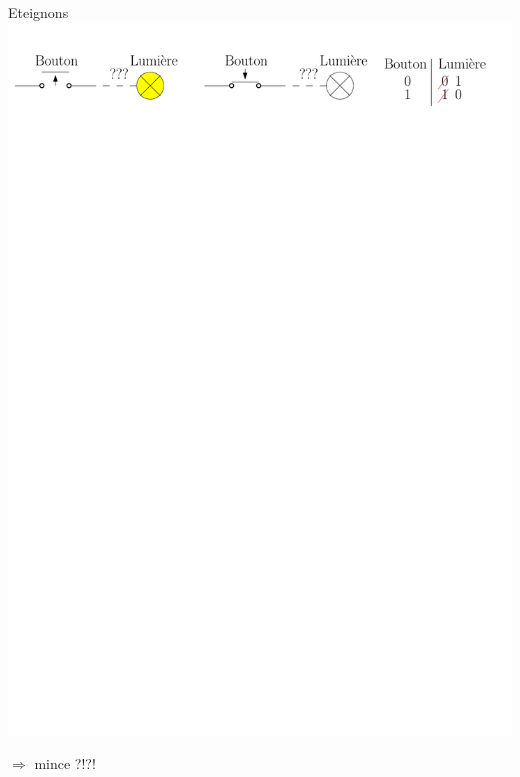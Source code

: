 \documentclass{beamer}
\begin{document}
\begin{frame}
\begin{block}{Eteignons}
\centering\includegraphics[width=\linewidth]{Figs/bouton_lumiere2.pdf}
\end{block}
$\Rightarrow$ mince ?!?!
\end{frame}
\end{document}
